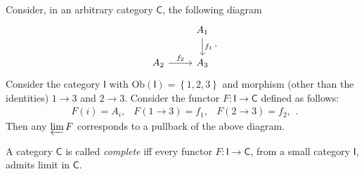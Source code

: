 \begin{ex}
	Consider, in an arbitrary category $\mathsf{C}$, the following diagram
	\begin{equation}
	\begin{tikzcd}
		& A_1 \arrow[d, "f_1", rightarrow] \\
		A_2 \arrow[r, "f_2", rightarrow] &
		A_3
	\end{tikzcd}
	.\end{equation} 
	Consider the category $\mathsf{I}$ with $\mathrm{Ob} \left(\mathsf{I}\right) = \left\{ 1, 2, 3 \right\}$ and morphism (other than the identities) $1 \to 3$ and $2 \to 3$.
	Consider the functor $F: \mathsf{I} \to \mathsf{C}$ defined as follows:
	 \begin{equation}
		 \begin{matrix}
			 F(i) = A_i, &
			 F( 1 \to 3) = f_1, &
			 F( 2 \to 3) = f_2,
		 \end{matrix} 
	.\end{equation} 
	Then any $\varprojlim F$ corresponds to a pullback of the above diagram.
\end{ex} 

\begin{defn}
	A category $\mathsf{C}$ is called {\em complete} iff 
	every functor $F: \mathsf{I} \to \mathsf{C}$, from a small category $\mathsf{I}$, admits limit in $\mathsf{C}$.
\end{defn}

